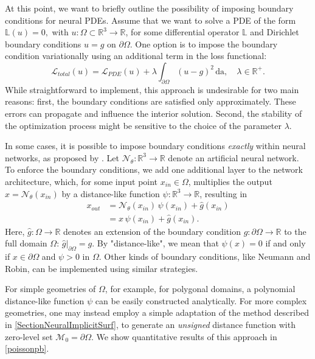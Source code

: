 \documentclass[12pt,openany]{book}
\newcommand{\R}{\mathbb{R}}
\theoremstyle{plainnormal}
\theoremstyle{remark}
\begin{document}
At this point, we want to briefly outline the possibility of imposing boundary conditions for neural PDEs. Assume that we want to solve a PDE of the form $\mathbb{L}(u) = 0,$ with $  u:\Omega\subset\R^3\rightarrow\R$, for some differential operator $\mathbb{L}$ and Dirichlet boundary conditions $ u = g \text{ on }\partial\Omega$. One option is to impose the boundary condition variationally using an additional term in the loss functional: $$\mathcal L_{total}(u) = \mathcal{L}_{PDE}(u) + \lambda \int_{\partial \Omega} (u - g) ^2\, \mathrm{da}, \quad \lambda \in\R^+.$$
While straightforward to implement, this approach is undesirable for two main reasons: first, the boundary conditions are satisfied only approximately. These errors can propagate and influence the interior solution.  Second, the stability of the optimization process might be sensitive to the choice of the parameter $\lambda$.\par
In some cases, it is possible to impose boundary conditions \emph{exactly} within neural networks, as proposed by \cite{BERRONE2023e18820}. Let $\mathcal{N}_\theta: \R^3 \rightarrow \R$ denote an artificial neural network. To enforce the boundary conditions, we add one additional layer to the network architecture, which, for some input point $x_{in} \in \Omega$, multiplies the output $x= \mathcal N _\theta(x_{in})$  by a distance-like function $\psi: \R^3 \rightarrow\R$, resulting in 
\begin{align*}
    x_{out} &= \mathcal N_\theta(x_{in})\,\psi(x_{in}) + \hat g(x_{in}) \\&= x\,\psi(x_{in})+ \hat g(x_{in}).
\end{align*}
Here, $\hat{g}: \Omega \rightarrow\R$ denotes an extension of the boundary condition $g: \partial \Omega \rightarrow \R $ to the full domain $\Omega$: $\hat g|_{\partial \Omega} = g$. By "distance-like", we mean that $\psi(x) = 0 $ if and only if $ x \in \partial  \Omega$ and $\psi > 0$ in $\Omega$. Other kinds of boundary conditions, like Neumann and Robin, can be implemented using similar strategies. \par
For simple geometries of $\Omega$, for example, for polygonal domains, a polynomial distance-like function $\psi$ can be easily constructed analytically. For more complex geometries, one may instead employ a simple adaptation of the method described in \cref{SectionNeuralImplicitSurf}, to generate an \emph{unsigned} distance function with zero-level set $\mathcal M_0 = \partial \Omega$. We show quantitative results of this approach in \cref{poissonpb}.
\end{document}
